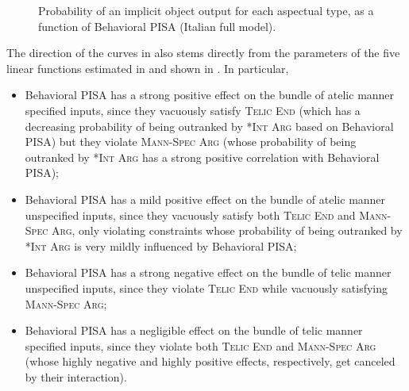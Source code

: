 \begin{figure}[htb]
\caption{Probability of an implicit object output for each aspectual type, as a function of Behavioral PISA (Italian full model).}
    
\end{figure}

The direction of the curves in  also stems directly from the parameters of the five linear functions estimated in  and shown in . In particular,
\begin{itemize}
    \item Behavioral PISA has a strong positive effect on the bundle of atelic manner specified inputs, since they vacuously satisfy \textsc{Telic End} (which has a decreasing probability of being outranked by \textsc{*Int Arg} based on Behavioral PISA) but they violate \textsc{Mann-Spec Arg} (whose probability of being outranked by \textsc{*Int Arg} has a strong positive correlation with Behavioral PISA);
    \item Behavioral PISA has a mild positive effect on the bundle of atelic manner unspecified inputs, since they vacuously satisfy both \textsc{Telic End} and \textsc{Mann-Spec Arg}, only violating constraints whose probability of being outranked by \textsc{*Int Arg} is very mildly influenced by Behavioral PISA;
    \item Behavioral PISA has a strong negative effect on the bundle of telic manner unspecified inputs, since they violate \textsc{Telic End} while vacuously satisfying \textsc{Mann-Spec Arg};
    \item Behavioral PISA has a negligible effect on the bundle of telic manner specified inputs, since they violate both \textsc{Telic End} and \textsc{Mann-Spec Arg} (whose highly negative and highly positive effects, respectively, get canceled by their interaction).
\end{itemize}

